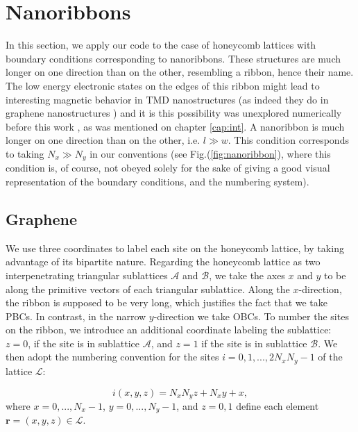 \section{Nanoribbons}
\label{sec:nanoribbon}

In this section, we apply our code to the case of honeycomb lattices with boundary conditions corresponding to nanoribbons. These structures are much longer on one direction than on the other, resembling a ribbon, hence their name.
The low energy electronic states on the edges of this ribbon might lead to interesting magnetic behavior in \ac{TMD} nanostructures (as indeed they do in graphene nanostructures \cite{yazyev_emergence_2010}) and it is this possibility was unexplored numerically before this work \cite{feldner_dynamical_2011, golor_quantum_2013}, as was mentioned on chapter \ref{cap:int}.
A nanoribbon is much longer on one direction than on the other, i.e. $l \gg w$. 
This condition corresponds to taking $N_x \gg N_y$ in our conventions (see Fig.(\ref{fig:nanoribbon}), where this condition is, of course, not obeyed solely for the sake of giving a good visual representation of the boundary conditions, and the numbering system).

\subsection{Graphene}
\label{sec:graphene}

We use three coordinates to label each site on the honeycomb lattice, by taking advantage of its bipartite nature.
Regarding the honeycomb lattice as two interpenetrating triangular sublattices $\mathcal{A}$ and $\mathcal{B}$, we take the axes $x$ and $y$ to be along the primitive vectors of each triangular sublattice.
Along the $x$-direction, the ribbon is supposed to be very long, which justifies the fact that we take \acp{PBC}.
In contrast, in the narrow $y$-direction we take \acp{OBC}.
To number the sites on the ribbon, we introduce an additional coordinate labeling the sublattice: $z = 0$, if the site is in sublattice $\mathcal{A}$, and $z = 1$ if the site is in sublattice $\mathcal{B}$.
We then adopt the numbering convention for the sites $i = 0,1, ..., 2 N_x N_y - 1$ of the lattice $\mathcal{L}$:

\begin{equation}\label{eq:numbering}
i (x, y, z) = N_x N_y z + N_x y + x,
\end{equation}
where $x = 0, ..., N_x - 1$, $y = 0, ..., N_y - 1$, and $z = 0, 1$ define each element $\bm r = (x, y, z) \in \mathcal{L}$.

